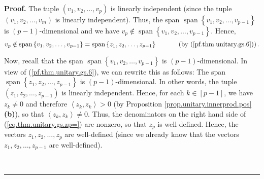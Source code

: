 \documentclass[numbers=enddot,12pt,final,onecolumn,notitlepage]{scrartcl}%
\numberwithin{exer}{subsection}
\theoremstyle{definition}
\newenvironment{proof}[1][Proof]{\noindent\textbf{#1.} }{\ \rule{0.5em}{0.5em}}
\begin{document}
\begin{proof}
The tuple $\left(  v_{1},v_{2},\ldots,v_{p}\right)  $ is linearly independent
(since the tuple $\left(  v_{1},v_{2},\ldots,v_{m}\right)  $ is linearly
independent). Thus, the span $\operatorname*{span}\left\{  v_{1},v_{2}%
,\ldots,v_{p-1}\right\}  $ is $\left(  p-1\right)  $-dimensional and we have
$v_{p}\notin\operatorname*{span}\left\{  v_{1},v_{2},\ldots,v_{p-1}\right\}
$. Hence,%
\[
v_{p}\notin\operatorname*{span}\left\{  v_{1},v_{2},\ldots,v_{p-1}\right\}
=\operatorname*{span}\left\{  z_{1},z_{2},\ldots,z_{p-1}\right\}
\ \ \ \ \ \ \ \ \ \ \left(  \text{by (\ref{pf.thm.unitary.gs.6})}\right)  .
\]


Now, recall that the span $\operatorname*{span}\left\{  v_{1},v_{2}%
,\ldots,v_{p-1}\right\}  $ is $\left(  p-1\right)  $-dimensional. In view of
(\ref{pf.thm.unitary.gs.6}), we can rewrite this as follows: The span
$\operatorname*{span}\left\{  z_{1},z_{2},\ldots,z_{p-1}\right\}  $ is
$\left(  p-1\right)  $-dimensional. In other words, the tuple $\left(
z_{1},z_{2},\ldots,z_{p-1}\right)  $ is linearly independent. Hence, for each
$k\in\left[  p-1\right]  $, we have $z_{k}\neq0$ and therefore $\left\langle
z_{k},z_{k}\right\rangle >0$ (by Proposition \ref{prop.unitary.innerprod.pos}
\textbf{(b)}), so that $\left\langle z_{k},z_{k}\right\rangle \neq0$. Thus,
the denominators on the right hand side of (\ref{eq.thm.unitary.gs.zp=}) are
nonzero, so that $z_{p}$ is well-defined. Hence, the vectors $z_{1}%
,z_{2},\ldots,z_{p}$ are well-defined (since we already know that the vectors
$z_{1},z_{2},\ldots,z_{p-1}$ are well-defined).


\end{proof}
\end{document}
